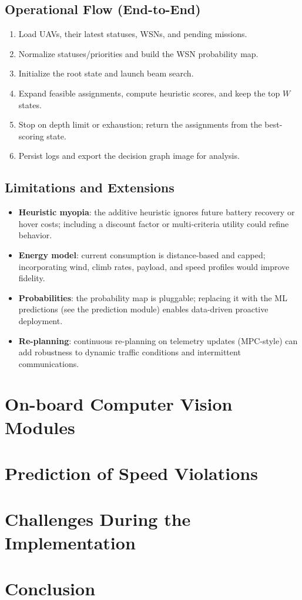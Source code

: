 \subsection*{Operational Flow (End-to-End)}
\begin{enumerate}
  \item Load UAVs, their latest statuses, WSNs, and pending missions.
  \item Normalize statuses/priorities and build the WSN probability map.
  \item Initialize the root state and launch beam search.
  \item Expand feasible assignments, compute heuristic scores, and keep the top \(W\) states.
  \item Stop on depth limit or exhaustion; return the assignments from the best-scoring state.
  \item Persist logs and export the decision graph image for analysis.
\end{enumerate}

\subsection*{Limitations and Extensions}
\begin{itemize}
  \item \textbf{Heuristic myopia}: the additive heuristic ignores future battery recovery or hover costs;
        including a discount factor or multi-criteria utility could refine behavior.
  \item \textbf{Energy model}: current consumption is distance-based and capped; incorporating wind,
        climb rates, payload, and speed profiles would improve fidelity.
  \item \textbf{Probabilities}: the probability map is pluggable; replacing it with the ML predictions
        (see the prediction module) enables data-driven proactive deployment.
  \item \textbf{Re-planning}: continuous re-planning on telemetry updates (MPC-style) can add robustness
        to dynamic traffic conditions and intermittent communications.
\end{itemize}

\section{On-board Computer Vision Modules}

\section{Prediction of Speed Violations}

\section{Challenges During the Implementation}

\section*{Conclusion}